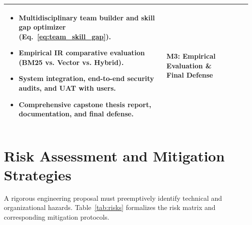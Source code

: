 \documentclass[11pt,a4paper]{article}
\begin{document}
\begin{table}[H]
\begin{tabularx}{\textwidth}{@{}p{2.5cm} p{1.8cm} X p{3.4cm}@{}}
\begin{itemize}[leftmargin=*,noitemsep]
    \item Multidisciplinary team builder and skill gap optimizer (Eq.~\ref{eq:team_skill_gap}).
    \item Empirical IR comparative evaluation (BM25 vs. Vector vs. Hybrid).
    \item System integration, end-to-end security audits, and UAT with users.
    \item Comprehensive capstone thesis report, documentation, and final defense.
\end{itemize} & \textbf{M3: Empirical Evaluation \& Final Defense} \\
\bottomrule
\end{tabularx}
\end{table}

\clearpage
\section[Risk Assessment \& Mitigation]{Risk Assessment and Mitigation Strategies}

A rigorous engineering proposal must preemptively identify technical and organizational hazards. Table~\ref{tab:risks} formalizes the risk matrix and corresponding mitigation protocols.
\end{document}
